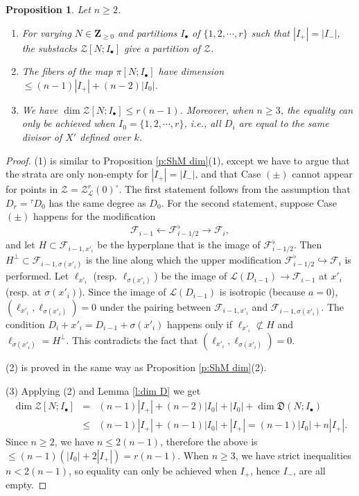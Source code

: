 \documentclass[reqno]{amsart}
\numberwithin{equation}{section}
\newcommand{\Z}{\mathbf{Z}}
\newcommand{\ft}{{}^{\tau}}
\newcommand{\inj}{\hookrightarrow}
\newcommand{\bu}{\bullet}
\newcommand{\s}{\sigma}
\newcommand\cF{\mathcal{F}}
\newcommand\cL{\mathcal{L}}
\newcommand\cZ{\mathcal{Z}}
\newcommand\frD{\mathfrak{D}}
\newtheorem{prop}[thm]{Proposition}
\theoremstyle{remark}
\numberwithin{equation}{section}
\begin{document}
\begin{prop}\label{p:dim ZL0} Let $n \geq 2$. \hfill 
\begin{enumerate}
\item For varying $N\in \Z_{\ge0}$ and partitions $I_{\bu}$ of $\{1,2,\cdots, r\}$ such that $|I_{+}|=|I_{-}|$, the substacks  $\cZ[N;I_{\bu}]$ give a partition of $\cZ$. 
\item The fibers of the map $\pi[N;I_{\bu}]$ have dimension $\le(n-1)|I_{+}|+(n-2)|I_{0}|$.
\item We have $\dim \cZ[N;I_{\bu}]\le r(n-1)$. Moreover, when $n\ge3$, the equality  can only be achieved when $I_{0}=\{1,2,\cdots, r\}$, i.e., all $D_{i}$ are equal to the same divisor of $X'$ defined over $k$.
\end{enumerate}
\end{prop}
\begin{proof}
(1) is similar to Proposition \ref{p:ShM dim}(1), except we have to argue that the strata are only non-empty for $|I_+|=|I_-|$, and that Case $(\pm)$ cannot appear for points in $\cZ=\cZ^{r}_{\cL}(0)^{\circ}$. The first statement follows from the assumption that $D_r = \ft D_0$ has the same degree as $D_0$. For the second statement, suppose Case $(\pm)$ happens for the modification 
\[
\cF_{i-1}\leftarrow \cF_{i-1/2}^{\flat}\to \cF_{i},
\]
and let $H\subset \cF_{i-1,x'_{i}}$ be the hyperplane that is the image of $\cF_{i-1/2}^{\flat}$. Then $H^{\bot}\subset \cF_{i-1,\s(x'_{i})}$ is the line along which the upper modification $\cF_{i-1/2}^{\flat}\inj \cF_{i}$ is performed. Let $\ell_{x'_{i}}$ (resp. $\ell_{\s(x'_{i})}$) be the image of $\cL(D_{i-1})\to \cF_{i-1}$ at $x'_{i}$ (resp. at $\s(x'_{i})$). Since the image of $\cL(D_{i-1})$ is isotropic (because $a=0$), $(\ell_{x'_{i}},\ell_{\s(x'_{i})})=0$ under the pairing between $\cF_{i-1,x'_{i}}$ and $\cF_{i-1,\s(x'_{i})}$. The condition $D_{i}+x'_{i}=D_{i-1}+\s(x'_{i})$ happens only if $\ell_{x'_{i}}\not\subset H$ and $\ell_{\s(x'_{i})}=H^{\bot}$. This contradicts the fact that $(\ell_{x'_{i}},\ell_{\s(x'_{i})})=0$.

(2) is proved in the same way as Proposition \ref{p:ShM dim}(2). 

(3) Applying (2) and Lemma \ref{l:dim D} we get
\begin{eqnarray*}
\dim\cZ[N;I_{\bu}]&=&  (n-1)|I_{+}|+(n-2)|I_{0}|+|I_{0}|+\dim \frD(N;I_{\bu})\\
&\le & (n-1)|I_{+}|+(n-1)|I_{0}|+|I_{+}|=(n-1)|I_{0}|+n|I_{+}|.
\end{eqnarray*}
Since $n\ge2$,  we have $n\le2(n-1)$, therefore the above is $\le (n-1)(|I_{0}|+2|I_{+}|)=r(n-1)$. When $n\ge3$, we have strict inequalities $n<2(n-1)$, so equality can only be achieved when $I_{+}$, hence $I_{-}$, are all empty.
\end{proof}
\end{document}

